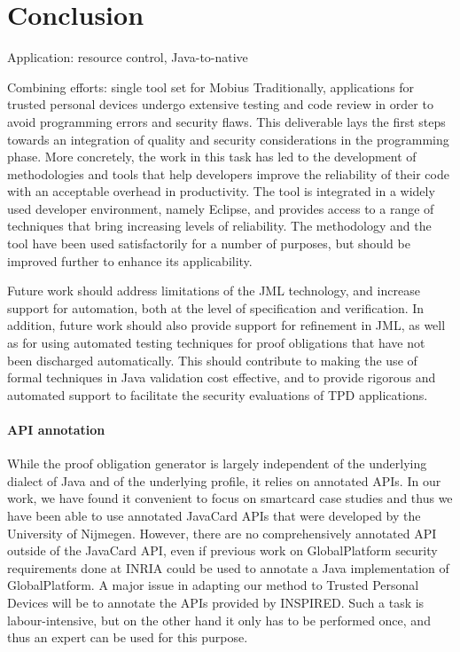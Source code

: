 \section{Conclusion}\label{SecConcl}

Application: resource control, Java-to-native

Combining efforts: single tool set for Mobius
Traditionally, applications for trusted personal devices undergo
extensive testing and code review in order to avoid programming errors
and security flaws. This deliverable lays the first steps towards an
integration of quality and security considerations in the programming
phase. More concretely, the work in this task has led to the
development of methodologies and tools that help developers improve
the reliability of their code with an acceptable overhead in
productivity. The tool is integrated in a widely used developer
environment, namely Eclipse, and provides access to a range of
techniques that bring increasing levels of reliability.  The
methodology and the tool have been used satisfactorily for a number of
purposes, but should be improved further to enhance its applicability.


Future work should address limitations of the JML technology, and
increase support for automation, both at the level of specification
and verification. In addition, future work should also provide support
for refinement in JML, as well as for using automated testing
techniques for proof obligations that have not been discharged
automatically. This should contribute to making the use of formal
techniques in Java validation cost effective, and to provide rigorous
and automated support to facilitate the security evaluations of TPD
applications.


\paragraph{API annotation}
While the proof obligation generator is largely independent of the
underlying dialect of Java and of the underlying profile, it relies on
annotated APIs. In our work, we have found it convenient to focus on
smartcard case studies and thus we have been able to use annotated
JavaCard APIs that were developed by the University of Nijmegen.
However, there are no comprehensively annotated API outside of the
Java\-Card API, even if previous work on GlobalPlatform security
requirements done at INRIA could be used to annotate a Java
implementation of GlobalPlatform. A major issue in adapting our method
to Trusted Personal Devices will be to annotate the APIs provided by
INSPIRED. Such a task is labour-intensive, but on the other hand it
only has to be performed once, and thus an expert can be used for this
purpose.

